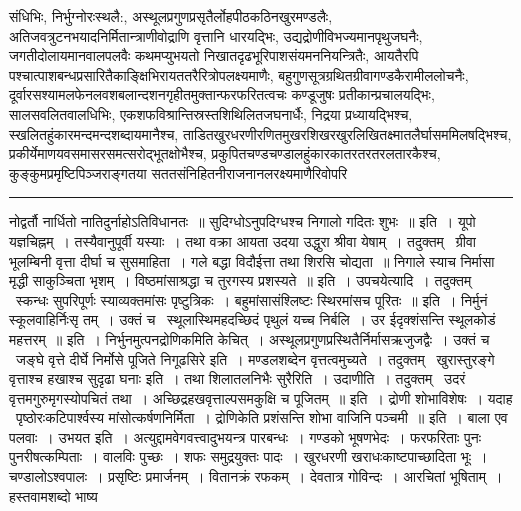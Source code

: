 \documentclass[11pt, openany]{book}
\begin{document}
\begin{sloppypar}
\noindent
संधिभिः, निर्भुग्नोरःस्थलै:, अस्थूलप्रगुणप्रसृतैर्लोहपीठकठिनखुरमण्डलैः, अतिजवत्रुटनभयादनिर्मितान्त्राणीवोद्राणि वृत्तानि धारयद्भिः, उद्यद्रोणीविभज्यमानपृथुजघनैः, जगतीदोलायमानवालपलवैः कथमप्युभयतो निखातदृढभूरिपाशसंयमननियन्त्रितैः, आयतैरपि पश्चात्पाशबन्धप्रसारितैकाङ्क्षिभिरायततरैरित्रोपलक्ष्यमाणैः, बहुगुणसूत्रग्रथितग्रीवागण्डकैरामीललोचनैः, दूर्वारसश्यामलफेनलवशबलान्दशनगृहीतमुक्तान्फरफरितत्वचः कण्डूजुषः प्रतीकान्प्रचालयद्भिः, सालसवलितवालधिभिः, एकशफविश्रान्तिस्रस्तशिथिलितजघनार्धैः, निद्रया प्रध्यायद्भिश्च, स्खलितहुंकारमन्दमन्दशब्दायमानैश्च, ताडितखुरधरणीरणितमुखरशिखरखुरलिखितक्ष्मातलैर्घासममिलषद्भिश्च, प्रकीर्येमाणयवसमासरसमत्सरोद्भूतक्षोभैश्च, प्रकुपितचण्डचण्डालहुंकारकातरतरतरलतारकैश्च, कुङ्कुमप्रमृष्टिपिञ्जराङ्गतया सततसंनिहितनीराजनानलरक्ष्यमाणैरिवोपरि \textendash
\end{sloppypar}

\vspace{2mm}
\hrule

\noindent
{\s नोद्वर्तौ नार्धितो नातिदुर्नाहोऽतिविधानतः~॥ सुदिग्धोऽनुपदिग्धश्च निगालो गदितः शुभः~॥ इति~। यूपो यज्ञचिह्नम्~। तस्यैवानुपूर्वी यस्याः~। तथा वक्रा आयता उदया उद्धुरा श्रीवा येषाम्~। तदुक्तम् \textendash\ {\qt ग्रीवा भूलम्बिनी वृत्ता दीर्घा च सुसमाहिता~। गले बद्धा विदौईत्ता तथा शिरसि चोद्यता~॥ निगाले स्याच निर्मासा मृद्धी साकुञ्चिता भृशम्~। विष्ठमांसाश्रद्धा च तुरगस्य प्रशस्यते~॥} इति~। {\qtt उपचयेत्यादि}~। तदुक्तम् \textendash\ स्कन्धः सुपरिपूर्णः स्याव्यक्तमांसः पृष्टुत्रिकः~। बहुमांसासंश्लिष्टः स्थिरमांसच पूरितः~॥ इति~। निर्मुनं स्कूलवाहिर्निःसृ तम्~। उक्तं च \textendash\ {\qt स्थूलास्थिमहदच्छिदं पृथुलं यच्च निर्बलि~। उर ईदृक्शंसन्ति स्थूलकोडं महत्तरम्~॥} इति~। निर्भुनमुत्पनद्रोणिकमिति केचित्~। अस्थूलप्रगुणप्रस्थितैर्निर्मासऋजुजद्वैः~। उक्तं च \textendash\ {\qt जङ्घे वृत्ते दीर्घे निर्मोसे पूजिते निगूढसिरे} इति~। मण्डलशब्देन वृत्तत्वमुच्यते~। तदुक्तम् \textendash\ {\qt खुरास्तुरङ्गे वृत्ताश्च हखाश्च सुदृढा घनाः} इति~। तथा शिलातलनिभैः सुरैरिति~। {\qtt उदाणीति}~। तदुक्तम् \textendash\ {\qt उदरं वृत्तमगुरुमृगस्योपचितं तथा~। अच्छिद्रहखवृत्ताल्पसमकुक्षि च पूजितम्~॥} इति~। द्रोणी शोभाविशेषः~। यदाह \textendash\ {\qt पृष्ठोरःकटिपार्श्वस्य मांसोत्कर्षणनिर्मिता~। द्रोणिकेति प्रशंसन्ति शोभा वाजिनि पञ्चमी~॥} इति~। बाला एव पलवाः~। {\qtt उभयत इति}~। अत्युद्दामवेगवत्त्वादुभयन्त्र पारबन्धः~। गण्डको भूषणभेदः~। फरफरिताः पुनः पुनरीषत्कम्पिताः~। वालविः पुच्छः~। शफः समुद्रयुक्तः पादः~। खुरधरणी खराधःकाष्टपाच्छादिता भूः~। चण्डालोऽश्वपालः~। प्रसृष्टिः प्रमार्जनम्~। वितानक्रं रफकम्~। देवतात्र गोविन्दः~। आरचितां भूषिताम्~। हस्तवामशब्दो भाष्य\textendash}
\end{document}
